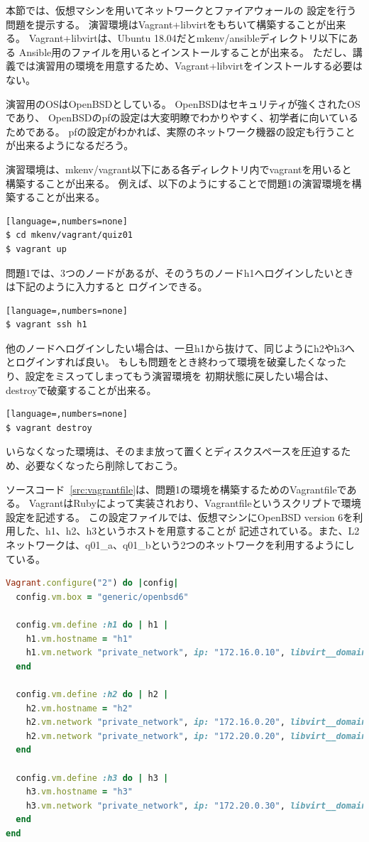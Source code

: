 
本節では、仮想マシンを用いてネットワークとファイアウォールの
設定を行う問題を提示する。
演習環境はVagrant+libvirtをもちいて構築することが出来る。
Vagrant+libvirtは、Ubuntu 18.04だとmkenv/ansibleディレクトリ以下にある
Ansible用のファイルを用いるとインストールすることが出来る。
ただし、講義では演習用の環境を用意するため、Vagrant+libvirtをインストールする必要はない。

演習用のOSはOpenBSDとしている。
OpenBSDはセキュリティが強くされたOSであり、
OpenBSDのpfの設定は大変明瞭でわかりやすく、初学者に向いているためである。
pfの設定がわかれば、実際のネットワーク機器の設定も行うことが出来るようになるだろう。

演習環境は、mkenv/vagrant以下にある各ディレクトリ内でvagrantを用いると
構築することが出来る。
例えば、以下のようにすることで問題1の演習環境を構築することが出来る。
\begin{lstlisting}[language=,numbers=none]
$ cd mkenv/vagrant/quiz01
$ vagrant up
\end{lstlisting}
問題1では、3つのノードがあるが、そのうちのノードh1へログインしたいときは下記のように入力すると
ログインできる。
\begin{lstlisting}[language=,numbers=none]
$ vagrant ssh h1
\end{lstlisting}
他のノードへログインしたい場合は、一旦h1から抜けて、同じようにh2やh3へとログインすれば良い。
もしも問題をとき終わって環境を破棄したくなったり、設定をミスってしまってもう演習環境を
初期状態に戻したい場合は、destroyで破棄することが出来る。
\begin{lstlisting}[language=,numbers=none]
$ vagrant destroy
\end{lstlisting}
いらなくなった環境は、そのまま放って置くとディスクスペースを圧迫するため、必要なくなったら削除しておこう。

ソースコード~\ref{src:vagrantfile}は、問題1の環境を構築するためのVagrantfileである。
VagrantはRubyによって実装されおり、Vagrantfileというスクリプトで環境設定を記述する。
この設定ファイルでは、仮想マシンにOpenBSD version 6を利用した、h1、h2、h3というホストを用意することが
記述されている。また、L2ネットワークは、q01\_a、q01\_bという2つのネットワークを利用するようにしている。
\begin{lstlisting}[language=Ruby,caption=演習問題1のVagrantfile,label=src:vagrantfile]
Vagrant.configure("2") do |config|
  config.vm.box = "generic/openbsd6"

  config.vm.define :h1 do | h1 |
    h1.vm.hostname = "h1"
    h1.vm.network "private_network", ip: "172.16.0.10", libvirt__domain_name: "q01_a"
  end

  config.vm.define :h2 do | h2 |
    h2.vm.hostname = "h2"
    h2.vm.network "private_network", ip: "172.16.0.20", libvirt__domain_name: "q01_a"
    h2.vm.network "private_network", ip: "172.20.0.20", libvirt__domain_name: "q01_b"
  end

  config.vm.define :h3 do | h3 |
    h3.vm.hostname = "h3"
    h3.vm.network "private_network", ip: "172.20.0.30", libvirt__domain_name: "q01_b"
  end
end
\end{lstlisting}


